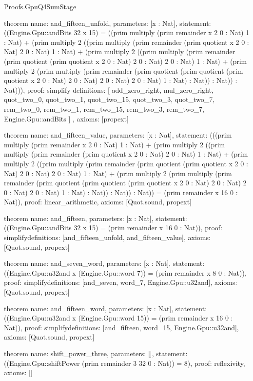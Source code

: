 \begin{lexlean}{Proofs.GpuQ4SumStage}
\begin{semanticmodule}
theorem{
  name: and_fifteen_unfold,
  parameters: [x : Nat],
  statement: ((Engine.Gpu::andBits 32 x 15) = ((prim multiply (prim remainder x 2 0 : Nat) 1 : Nat) + (prim multiply 2 ((prim multiply (prim remainder (prim quotient x 2 0 : Nat) 2 0 : Nat) 1 : Nat) + (prim multiply 2 ((prim multiply (prim remainder (prim quotient (prim quotient x 2 0 : Nat) 2 0 : Nat) 2 0 : Nat) 1 : Nat) + (prim multiply 2 (prim multiply (prim remainder (prim quotient (prim quotient (prim quotient x 2 0 : Nat) 2 0 : Nat) 2 0 : Nat) 2 0 : Nat) 1 : Nat) : Nat)) : Nat)) : Nat))),
  proof: simplify{
    definitions: [
      add_zero_right,
      mul_zero_right,
      quot_two_0,
      quot_two_1,
      quot_two_15,
      quot_two_3,
      quot_two_7,
      rem_two_0,
      rem_two_1,
      rem_two_15,
      rem_two_3,
      rem_two_7,
      Engine.Gpu::andBits
    ]
  },
  axioms: [propext]
}

theorem{
  name: and_fifteen_value,
  parameters: [x : Nat],
  statement: (((prim multiply (prim remainder x 2 0 : Nat) 1 : Nat) + (prim multiply 2 ((prim multiply (prim remainder (prim quotient x 2 0 : Nat) 2 0 : Nat) 1 : Nat) + (prim multiply 2 ((prim multiply (prim remainder (prim quotient (prim quotient x 2 0 : Nat) 2 0 : Nat) 2 0 : Nat) 1 : Nat) + (prim multiply 2 (prim multiply (prim remainder (prim quotient (prim quotient (prim quotient x 2 0 : Nat) 2 0 : Nat) 2 0 : Nat) 2 0 : Nat) 1 : Nat) : Nat)) : Nat)) : Nat)) = (prim remainder x 16 0 : Nat)),
  proof: linear_arithmetic{},
  axioms: [Quot.sound, propext]
}

theorem{
  name: and_fifteen,
  parameters: [x : Nat],
  statement: ((Engine.Gpu::andBits 32 x 15) = (prim remainder x 16 0 : Nat)),
  proof: simplify{definitions: [and_fifteen_unfold, and_fifteen_value]},
  axioms: [Quot.sound, propext]
}

theorem{
  name: and_seven_word,
  parameters: [x : Nat],
  statement: ((Engine.Gpu::u32and x (Engine.Gpu::word 7)) = (prim remainder x 8 0 : Nat)),
  proof: simplify{definitions: [and_seven, word_7, Engine.Gpu::u32and]},
  axioms: [Quot.sound, propext]
}

theorem{
  name: and_fifteen_word,
  parameters: [x : Nat],
  statement: ((Engine.Gpu::u32and x (Engine.Gpu::word 15)) = (prim remainder x 16 0 : Nat)),
  proof: simplify{definitions: [and_fifteen, word_15, Engine.Gpu::u32and]},
  axioms: [Quot.sound, propext]
}

theorem{
  name: shift_power_three,
  parameters: [],
  statement: ((Engine.Gpu::shiftPower (prim remainder 3 32 0 : Nat)) = 8),
  proof: reflexivity{},
  axioms: []
}


\end{semanticmodule}
\end{lexlean}
